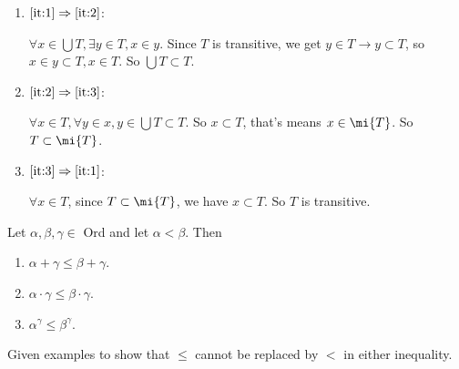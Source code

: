 \documentclass{ctexart}
\begin{document}
\begin{solution}
 \begin{enumerate}
  \item $\Cref{it:1}\Rightarrow \Cref{it:2}$:
  
  $\forall x\in \bigcup T,\exists y\in T,x\in y$. Since $T$ is transitive, we get $y\in T\to y\subset T$, so $x\in y\subset T,x\in T$. So $\bigcup T\subset T$. 
  \item $\Cref{it:2}\Rightarrow \Cref{it:3}$:
  
  $\forall x\in T,\forall y\in x, y\in \bigcup T\subset T$. So $x\subset T$, that's means $x\in \mi{T}$. So $T\subset \mi{T}$.
  \item $\Cref{it:3}\Rightarrow \Cref{it:1}$:
  
  $\forall x\in T$, since $T\subset \mi{T}$, we have $x\subset T$. So $T$ is transitive.
 \end{enumerate}
\end{solution}

\begin{problem}
 Let $\alpha, \beta, \gamma \in$ Ord and let $\alpha<\beta$. Then
 \begin{enumerate}[label=\alph*,ref=\theproblem.\alph*]
  \item\label{it:11} $\alpha+\gamma \leq \beta+\gamma$.
  \item\label{it:12} $\alpha \cdot \gamma \leq \beta \cdot \gamma$.
  \item\label{it:13} $\alpha^\gamma \leq \beta^\gamma$.
 \end{enumerate}
Given examples to show that $\leq$ cannot be replaced by $<$ in either inequality.
\end{problem}
\end{document}
